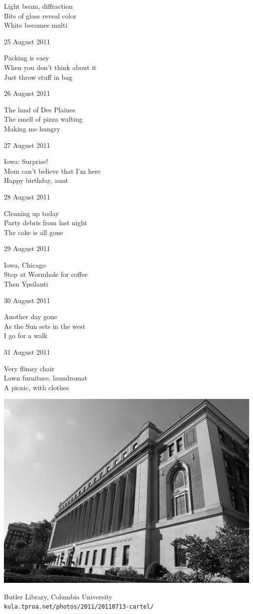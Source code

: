 \documentclass[12pt]{article}
\begin{document}
Light beam, diffraction \\
Bits of glass reveal color \\
White becomes multi


\newpage

25 August 2011

Packing is easy \\
When you don't think about it \\
Just throw stuff in bag

26 August 2011

The land of Des Plaines \\
The smell of pizza wafting \\
Making me hungry

27 August 2011

Iowa: Surprise! \\
Mom can't believe that I'm here \\
Happy birthday, aunt

28 August 2011

Cleaning up today \\
Party debris from last night \\
The cake is all gone

29 August 2011

Iowa, Chicago \\
Stop at Wormhole for coffee \\
Then Ypsilanti

30 August 2011

Another day gone \\
As the Sun sets in the west \\
I go for a walk

31 August 2011

Very flimsy chair \\
Lawn furniture, laundromat \\
A picnic, with clothes


\newpage

\begin{center}
\includegraphics{butler.png}

Butler Library, Columbia University \\
{\tt kula.tproa.net/photos/2011/20110713-cartel/}
\end{center}
\end{document}
